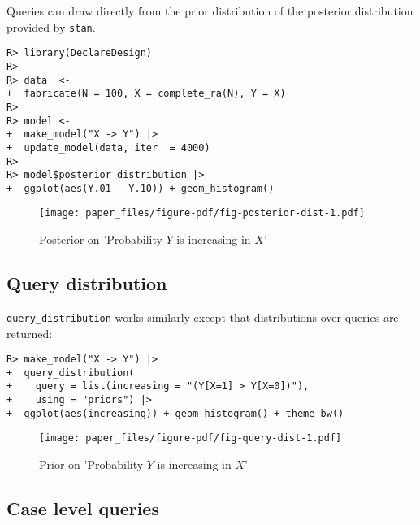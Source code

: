 \documentclass[
  11pt,
  article]{jss}
\begin{document}
Queries can draw directly from the prior distribution of the posterior
distribution provided by \texttt{stan}.

\begin{verbatim}
R> library(DeclareDesign)
R> 
R> data  <- 
+  fabricate(N = 100, X = complete_ra(N), Y = X)
R> 
R> model <- 
+  make_model("X -> Y") |>
+  update_model(data, iter  = 4000)
R> 
R> model$posterior_distribution |> 
+  ggplot(aes(Y.01 - Y.10)) + geom_histogram()
\end{verbatim}

\begin{figure}[t]

{\centering \texttt{[image: paper\_files/figure-pdf/fig-posterior-dist-1.pdf]}

}

\caption{\label{fig-posterior-dist}Posterior on 'Probability \(Y\) is
increasing in \(X\)'}

\end{figure}

\FloatBarrier

\hypertarget{query-distribution}{%
\subsection{Query distribution}\label{query-distribution}}

\texttt{query\_distribution} works similarly except that distributions
over queries are returned:

\begin{verbatim}
R> make_model("X -> Y") |> 
+  query_distribution(
+    query = list(increasing = "(Y[X=1] > Y[X=0])"), 
+    using = "priors") |>
+  ggplot(aes(increasing)) + geom_histogram() + theme_bw()
\end{verbatim}

\begin{figure}[t]

{\centering \texttt{[image: paper\_files/figure-pdf/fig-query-dist-1.pdf]}

}

\caption{\label{fig-query-dist}Prior on 'Probability \(Y\) is increasing
in \(X\)'}

\end{figure}

\hypertarget{case-level-queries}{%
\subsection{Case level queries}\label{case-level-queries}}
\end{document}
